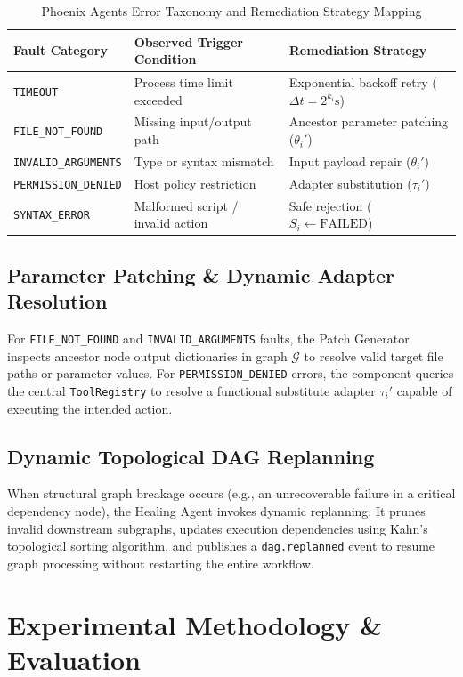 \documentclass[conference]{IEEEtran}
\begin{document}
\begin{table}[htbp]
\caption{Phoenix Agents Error Taxonomy and Remediation Strategy Mapping}
\label{tab:fault_taxonomy_mapping}
\centering
\begin{tabular}{p{2.2cm} p{3.2cm} p{2.2cm}}
\toprule
\textbf{Fault Category} & \textbf{Observed Trigger Condition} & \textbf{Remediation Strategy} \\
\midrule
\texttt{TIMEOUT} & Process time limit exceeded & Exponential backoff retry ($\Delta t = 2^{k_i} \text{s}$) \\
\texttt{FILE\_NOT\_FOUND} & Missing input/output path & Ancestor parameter patching ($\theta_i'$) \\
\texttt{INVALID\_ARGUMENTS} & Type or syntax mismatch & Input payload repair ($\theta_i'$) \\
\texttt{PERMISSION\_DENIED} & Host policy restriction & Adapter substitution ($\tau_i'$) \\
\texttt{SYNTAX\_ERROR} & Malformed script / invalid action & Safe rejection ($S_i \leftarrow \text{FAILED}$) \\
\bottomrule
\end{tabular}
\end{table}

\subsection{Parameter Patching & Dynamic Adapter Resolution}
For \texttt{FILE\_NOT\_FOUND} and \texttt{INVALID\_ARGUMENTS} faults, the Patch Generator inspects ancestor node output dictionaries in graph $\mathcal{G}$ to resolve valid target file paths or parameter values. For \texttt{PERMISSION\_DENIED} errors, the component queries the central \texttt{ToolRegistry} to resolve a functional substitute adapter $\tau_i'$ capable of executing the intended action.

\subsection{Dynamic Topological DAG Replanning}
When structural graph breakage occurs (e.g., an unrecoverable failure in a critical dependency node), the Healing Agent invokes dynamic replanning. It prunes invalid downstream subgraphs, updates execution dependencies using Kahn's topological sorting algorithm, and publishes a \texttt{dag.replanned} event to resume graph processing without restarting the entire workflow.

\section{Experimental Methodology & Evaluation}
\label{sec:evaluation}
\end{document}
